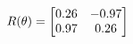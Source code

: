 \documentclass[preview]{standalone}
\begin{document}
\begin{align*}
\special{dvisvgm:raw <g id='unique000'>}R(\theta) = \begin{bmatrix}0.26 & -0.97\\0.97 & 0.26\end{bmatrix}\special{dvisvgm:raw </g>}
\end{align*}
\end{document}
